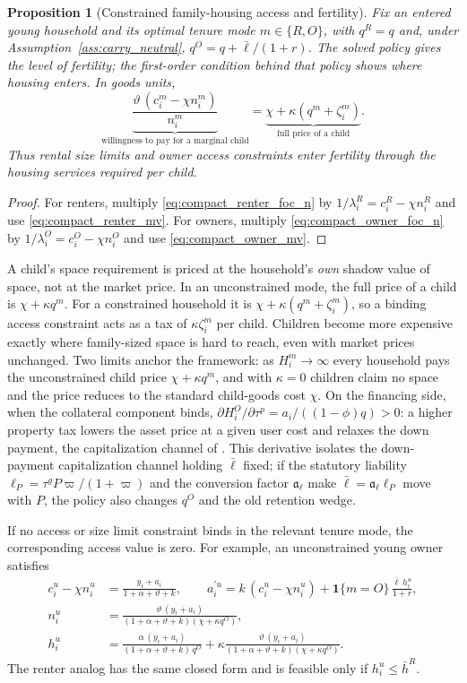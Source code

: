 \documentclass[11pt]{article}
\newtheorem{proposition}{Proposition}
\newcommand{\1}{\mathbf 1}
\begin{document}
\begin{proposition}[Constrained family-housing access and fertility]
Fix an entered young household and its optimal tenure mode $m\in\{R,O\}$, with $q^R=q$ and, under Assumption~\ref{ass:carry_neutral}, $q^O=q+\bar\ell/(1+r)$. The solved policy gives the level of fertility; the first-order condition behind that policy shows where housing enters. In goods units,
\[
\underbrace{\frac{\vartheta\,(c_i^m-\chi n_i^m)}{n_i^m}}_{\text{willingness to pay for a marginal child}}
=
\underbrace{\chi+\kappa(q^m+\zeta_i^m)}_{\text{full price of a child}} .
\]
Thus rental size limits and owner access constraints enter fertility through the housing services required per child.
\end{proposition}

\begin{proof}
For renters, multiply \eqref{eq:compact_renter_foc_n} by $1/\lambda_i^R=c_i^R-\chi n_i^R$ and use \eqref{eq:compact_renter_mv}. For owners, multiply \eqref{eq:compact_owner_foc_n} by $1/\lambda_i^O=c_i^O-\chi n_i^O$ and use \eqref{eq:compact_owner_mv}.
\end{proof}

A child's space requirement is priced at the household's \emph{own} shadow value of space, not at the market price. In an unconstrained mode, the full price of a child is $\chi+\kappa q^m$. For a constrained household it is $\chi+\kappa(q^m+\zeta_i^m)$, so a binding access constraint acts as a tax of $\kappa\zeta_i^m$ per child. Children become more expensive exactly where family-sized space is hard to reach, even with market prices unchanged. Two limits anchor the framework: as $H_i^m\to\infty$ every household pays the unconstrained child price $\chi+\kappa q^m$, and with $\kappa=0$ children claim no space and the price reduces to the standard child-goods cost $\chi$. On the financing side, when the collateral component binds, $\partial H_i^O/\partial\tau^p=a_i/((1-\phi)q)>0$: a higher property tax lowers the asset price at a given user cost and relaxes the down payment, the capitalization channel of \citet{coven2024}. This derivative isolates the down-payment capitalization channel holding $\bar\ell$ fixed; if the statutory liability $\ell_P=\tau^gP\varpi/(1+\varpi)$ and the conversion factor $\mathfrak a_\ell$ make $\bar\ell=\mathfrak a_\ell\ell_P$ move with $P$, the policy also changes $q^O$ and the old retention wedge.

If no access or size limit constraint binds in the relevant tenure mode, the corresponding access value is zero. For example, an unconstrained young owner satisfies
\begin{align*}
c_i^u-\chi n_i^u&=\frac{y_i+a_i}{1+\alpha+\vartheta+k},
\qquad
a_i^{\prime u}=k\,(c_i^u-\chi n_i^u)+\1\{m=O\}\,\frac{\bar\ell\,h_i^u}{1+r},
\\
n_i^u&=\frac{\vartheta\,(y_i+a_i)}{(1+\alpha+\vartheta+k)(\chi+\kappa q^O)},
\\
h_i^u&=\frac{\alpha\,(y_i+a_i)}{(1+\alpha+\vartheta+k)\,q^O}
+
\kappa\frac{\vartheta\,(y_i+a_i)}{(1+\alpha+\vartheta+k)(\chi+\kappa q^O)}.
\end{align*}
The renter analog has the same closed form and is feasible only if $h_i^u\le\bar h^R$.
\end{document}
